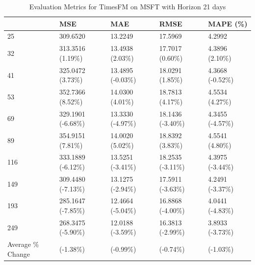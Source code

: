 \begin{table}
\caption{Evaluation Metrics for TimesFM on MSFT with Horizon 21 days}
\label{tab:fm_MSFT_h21_metrics}
\begin{tabular}{lllll}
\toprule
 & MSE & MAE & RMSE & MAPE (\%) \\
\midrule
25 & 309.6520 & 13.2249 & 17.5969 & 4.2992 \\
32 & 313.3516 (1.19\%) & 13.4938 (2.03\%) & 17.7017 (0.60\%) & 4.3896 (2.10\%) \\
41 & 325.0472 (3.73\%) & 13.4895 (-0.03\%) & 18.0291 (1.85\%) & 4.3668 (-0.52\%) \\
53 & 352.7366 (8.52\%) & 14.0300 (4.01\%) & 18.7813 (4.17\%) & 4.5534 (4.27\%) \\
69 & 329.1901 (-6.68\%) & 13.3330 (-4.97\%) & 18.1436 (-3.40\%) & 4.3455 (-4.57\%) \\
89 & 354.9151 (7.81\%) & 14.0020 (5.02\%) & 18.8392 (3.83\%) & 4.5541 (4.80\%) \\
116 & 333.1889 (-6.12\%) & 13.5251 (-3.41\%) & 18.2535 (-3.11\%) & 4.3975 (-3.44\%) \\
149 & 309.4480 (-7.13\%) & 13.1275 (-2.94\%) & 17.5911 (-3.63\%) & 4.2491 (-3.37\%) \\
193 & 285.1647 (-7.85\%) & 12.4664 (-5.04\%) & 16.8868 (-4.00\%) & 4.0441 (-4.83\%) \\
249 & 268.3475 (-5.90\%) & 12.0188 (-3.59\%) & 16.3813 (-2.99\%) & 3.8933 (-3.73\%) \\
Average \% Change & (-1.38\%) & (-0.99\%) & (-0.74\%) & (-1.03\%) \\
\bottomrule
\end{tabular}
\end{table}
